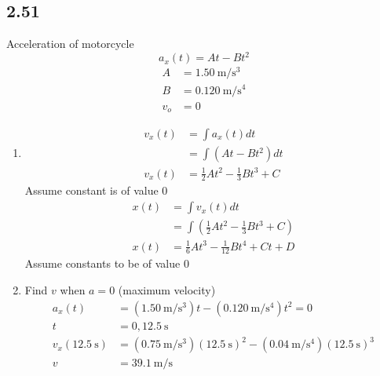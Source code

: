 \documentclass{article}
\begin{document}
\subsection{2.51}
Acceleration of motorcycle
$$ a_x(t) = At - Bt^2 $$
\begin{align*}
	A & = \SI{1.50}{\meter \per \second \cubed} \\
	B & = \SI{0.120}{\meter \per \second \tothe{4}} \\
	v_o & = 0
\end{align*}
\begin{enumerate}[label=\textbf{(\alph*)}]
	\item
		\begin{align*}
			v_x(t) & = \int a_x(t) dt \\
				   & = \int \left( At - Bt^2 \right) dt \\
			v_x(t) & = \frac{1}{2}At^2 - \frac{1}{3}Bt^3 + C
		\end{align*}
		Assume constant is of value $ 0 $
		\begin{align*}
			x(t) & = \int v_x(t) dt \\
				 & = \int \left( \frac{1}{2}At^2 - \frac{1}{3}Bt^3 + C \right) \\
			x(t) & = \frac{1}{6}At^3 - \frac{1}{12}Bt^4 + Ct + D
		\end{align*}
		Assume constants to be of value $ 0 $
	\item
		Find $ v $ when $ a = 0 $ (maximum velocity)
		\begin{align*}
			a_x(t) & = (\SI{1.50}{\meter \per \second \cubed})t - (\SI{0.120}{\meter \per \second \tothe{4}})t^2 = 0 \\
			t & = 0, \SI{12.5}{\second} \\
			v_x(\SI{12.5}{\second}) & = (\SI{0.75}{\meter \per \second \cubed})(\SI{12.5}{\second})^2 - (\SI{0.04}{\meter \per \second \tothe{4}})(\SI{12.5}{\second})^3 \\
			v & = \SI{39.1}{\meter \per \second}
		\end{align*}
\end{enumerate}
\end{document}
